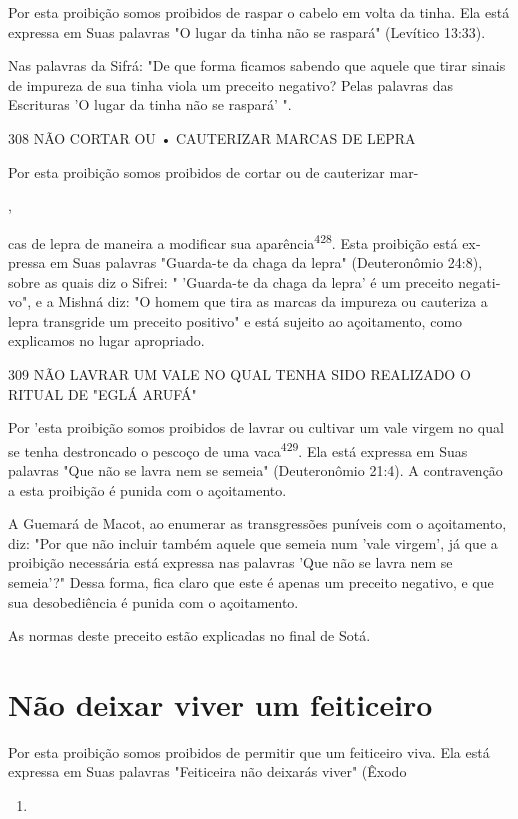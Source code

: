 \begin{itemize}
\begin{enumrate}
\begin{itemize}
\begin{itemize}
\begin{itemize}
Por esta proibição somos proibidos de raspar o cabelo em volta da tinha.
Ela está expressa em Suas palavras "O lugar da tinha não se raspará"
(Le­vítico 13:33).

Nas palavras da Sifrá: "De que forma ficamos sabendo que aquele que
tirar sinais de impureza de sua tinha viola um preceito negativo? Pelas
pala­vras das Escrituras 'O lugar da tinha não se raspará' ".

308 NÃO CORTAR OU • CAUTERIZAR MARCAS DE LEPRA


Por esta proibição somos proibidos de cortar ou de cauterizar mar-


,

cas de lepra de maneira a modificar sua aparência\textsuperscript{428}.
Esta proibição está ex­pressa em Suas palavras "Guarda-te da chaga da
lepra" (Deuteronômio 24:8), sobre as quais diz o Sifrei: " 'Guarda-te da
chaga da lepra' é um preceito negati­vo", e a Mishná diz: "O homem que
tira as marcas da impureza ou cauteriza a lepra transgride um preceito
positivo" e está sujeito ao açoitamento, como explicamos no lugar
apropriado.

309 NÃO LAVRAR UM VALE NO QUAL TENHA SIDO REALIZADO O RITUAL DE "EGLÁ
ARUFÁ"

Por 'esta proibição somos proibidos de lavrar ou cultivar um vale
vir­gem no qual se tenha destroncado o pescoço de uma
vaca\textsuperscript{429}. Ela está expres­sa em Suas palavras "Que não
se lavra nem se semeia" (Deuteronômio 21:4). A contravenção a esta
proibição é punida com o açoitamento.

A Guemará de Macot, ao enumerar as transgressões puníveis com o
açoitamento, diz: "Por que não incluir também aquele que semeia num
'vale virgem', já que a proibição necessária está expressa nas palavras
'Que não se lavra nem se semeia'?" Dessa forma, fica claro que este é
apenas um preceito negativo, e que sua desobediência é punida com o
açoitamento.

As normas deste preceito estão explicadas no final de Sotá.

\section{Não deixar viver um feiticeiro}

Por esta proibição somos proibidos de permitir que um feiticeiro vi­va.
Ela está expressa em Suas palavras "Feiticeira não deixarás viver"
(Êxodo


\begin{enumerate}
\def\labelenumi{\arabic{enumi}.}
\setcounter{enumi}{427}
\item
 

\end{enumerate}
\end{itemize}
\end{itemize}
\end{itemize}
\end{enumrate}
\end{itemize}
